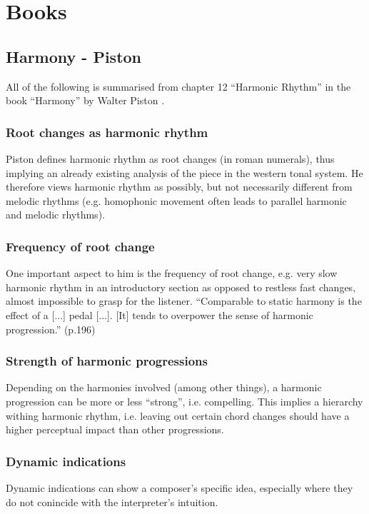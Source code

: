 \documentclass[a4paper,12pt]{report}
\begin{document}
\chapter{Books}

\section{Harmony - Piston}
All of the following is summarised from chapter 12  ``Harmonic Rhythm'' in the book ``Harmony'' by
Walter Piston \cite{piston1978harmony}.\\

\subsection{Root changes as harmonic rhythm}
Piston defines harmonic rhythm as root changes (in roman numerals), thus implying an already existing
analysis of the piece in the western tonal system. He therefore views harmonic rhythm as possibly, but
not necessarily different from melodic rhythms (e.g. homophonic movement often leads to parallel
harmonic and melodic rhythms).

\subsection{Frequency of root change}
One important aspect to him is the frequency of root change, e.g. very slow harmonic rhythm in an
introductory section as opposed to restless fast changes, almost impossible to grasp for the listener.
``Comparable to static harmony is the effect of a [...] pedal [...]. [It] tends to overpower the sense
of harmonic progression.'' (p.196)

\subsection{Strength of harmonic progressions}
Depending on the harmonies involved (among other things), a harmonic progression can be more or
less ``strong'', i.e. compelling. This implies a hierarchy withing harmonic rhythm, i.e. leaving out
certain chord changes should have a higher perceptual impact than other progressions.

\subsection{Dynamic indications}
Dynamic indications can show a composer's specific idea, especially where they do not conincide with
the interpreter's intuition.
\end{document}
